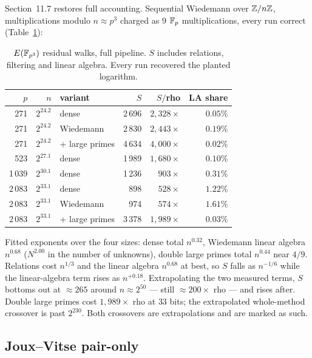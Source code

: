 Section~11.7 restores full accounting. Sequential Wiedemann over
$\mathbb{Z}/n\mathbb{Z}$, multiplications modulo $n\approx p^3$ charged as $9$
$\mathbb{F}_p$ multiplications, every run correct
(Table~\ref{tab:gaudry-la}):

\begin{table}[t]
\centering
\small
\caption{$E(\mathbb{F}_{p^3})$ residual walks, full pipeline. $S$ includes
  relations, filtering and linear algebra. Every run recovered the
  planted logarithm.}
\label{tab:gaudry-la}
\begin{tabular}{@{}rrlrrr@{}}
\toprule
$p$ & $n$ & variant & $S$ & $S/$rho & LA share \\
\midrule
271 & $2^{24.2}$ & dense & 2\,696 & $2{,}328\times$ & $0.05\%$ \\
271 & $2^{24.2}$ & Wiedemann & 2\,830 & $2{,}443\times$ & $0.19\%$ \\
271 & $2^{24.2}$ & + large primes & 4\,634 & $4{,}000\times$ & $0.02\%$ \\
523 & $2^{27.1}$ & dense & 1\,989 & $1{,}680\times$ & $0.10\%$ \\
1\,039 & $2^{30.1}$ & dense & 1\,236 & $903\times$ & $0.31\%$ \\
2\,083 & $2^{33.1}$ & dense & 898 & $528\times$ & $1.22\%$ \\
2\,083 & $2^{33.1}$ & Wiedemann & 974 & $574\times$ & $1.61\%$ \\
2\,083 & $2^{33.1}$ & + large primes & 3\,378 & $1{,}989\times$ & $0.03\%$ \\
\bottomrule
\end{tabular}
\end{table}

Fitted exponents over the four sizes: dense total $n^{0.32}$,
Wiedemann linear algebra $n^{0.68}$ ($N^{2.00}$ in the number of
unknowns), double large primes total $n^{0.44}$ near $4/9$. Relations
cost $n^{1/3}$ and the linear algebra $n^{0.68}$ at best, so $S$ falls
as $n^{-1/6}$ while the linear-algebra term rises as $n^{+0.18}$.
Extrapolating the two measured terms, $S$ bottoms out at $\approx 265$
around $n\approx 2^{50}$ --- still $\approx 200\times$ rho --- and
rises after. Double large primes cost $1{,}989\times$ rho at $33$
bits; the extrapolated whole-method crossover is past $2^{230}$. Both
crossovers are extrapolations and are marked as such.

\subsection{Joux--Vitse pair-only}

